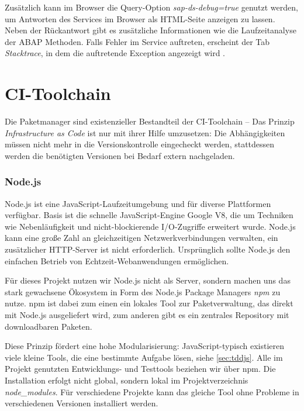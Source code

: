 Zusätzlich kann im Browser die Query-Option \textit{sap-ds-debug=true} genutzt werden, um Antworten des Services im Browser als HTML-Seite anzeigen zu lassen. Neben der Rückantwort gibt es zusätzliche Informationen wie \zB die Laufzeitanalyse der ABAP Methoden. Falls Fehler im Service auftreten, erscheint der Tab \textit{Stacktrace}, in dem die auftretende Exception angezeigt wird \cite[S.\ 555-556]{BoennenDreesFischerHeinzStrothmann2014}.



\section{CI-Toolchain}

Die Paketmanager sind existenzieller Bestandteil der \ac{CI}-Toolchain -- Das Prinzip \textit{Infrastructure as Code} ist nur mit ihrer Hilfe umzusetzen: Die Abhängigkeiten müssen nicht mehr in die Versionskontrolle eingecheckt werden, stattdessen werden die benötigten Versionen bei Bedarf extern nachgeladen.

\subsubsection{Node.js}
Node.js ist eine JavaScript-Laufzeitumgebung und für diverse Plattformen verfügbar. Basis ist die schnelle JavaScript-Engine Google V8, die um Techniken wie Nebenläufigkeit und nicht-blockierende I/O-Zugriffe erweitert wurde. Node.js kann eine große Zahl an gleichzeitigen Netzwerkverbindungen verwalten, ein zusätzlicher HTTP-Server ist nicht erforderlich. Ursprünglich sollte Node.js den einfachen Betrieb von Echtzeit-Webanwendungen ermöglichen.

Für dieses Projekt nutzen wir Node.js nicht als Server, sondern machen uns das stark gewachsene Ökosystem in Form des Node.js Package Managers \textit{npm} zu nutze. npm ist dabei zum einen ein lokales Tool zur Paketverwaltung, das direkt mit Node.js ausgeliefert wird, zum anderen gibt es ein zentrales Repository mit downloadbaren Paketen.

Diese Prinzip fördert eine hohe Modularisierung: JavaScript-typisch existieren viele kleine Tools, die eine bestimmte Aufgabe lösen, siehe \autoref{sec:tddjs}. Alle im Projekt genutzten Entwicklungs- und Testtools beziehen wir über npm.
Die Installation erfolgt nicht global, sondern lokal im Projektverzeichnis \textit{node\_modules}. Für verschiedene Projekte kann das gleiche Tool ohne Probleme in verschiedenen Versionen installiert werden. 

